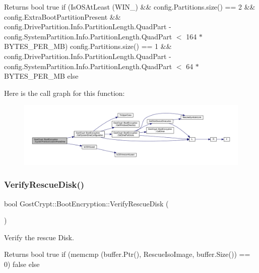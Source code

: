 \begin{DoxyReturn}{Returns}
bool true if (Is\+O\+S\+At\+Least (W\+I\+N\+\_) \&\& config.\+Partitions.\+size() == 2 \&\& config.\+Extra\+Boot\+Partition\+Present \&\& config.\+Drive\+Partition.\+Info.\+Partition\+Length.\+Quad\+Part -\/ config.\+System\+Partition.\+Info.\+Partition\+Length.\+Quad\+Part $<$ 164 $\ast$ B\+Y\+T\+E\+S\+\_\+\+P\+E\+R\+\_\+\+MB) config.\+Partitions.\+size() == 1 \&\& config.\+Drive\+Partition.\+Info.\+Partition\+Length.\+Quad\+Part -\/ config.\+System\+Partition.\+Info.\+Partition\+Length.\+Quad\+Part $<$ 64 $\ast$ B\+Y\+T\+E\+S\+\_\+\+P\+E\+R\+\_\+\+MB else 
\end{DoxyReturn}
Here is the call graph for this function\+:
\nopagebreak
\begin{figure}[H]
\begin{center}
\leavevmode
\includegraphics[width=350pt]{class_gost_crypt_1_1_boot_encryption_a770514730f74d63e147ea3b2510f5e0f_cgraph}
\end{center}
\end{figure}
\mbox{\label{class_gost_crypt_1_1_boot_encryption_a4792c6e0ed22b531c34152be522c8106}} 
\subsubsection{\texorpdfstring{Verify\+Rescue\+Disk()}{VerifyRescueDisk()}}
{\footnotesize\ttfamily bool Gost\+Crypt\+::\+Boot\+Encryption\+::\+Verify\+Rescue\+Disk (\begin{DoxyParamCaption}{ }\end{DoxyParamCaption})}



Verify the rescue Disk. 

\begin{DoxyReturn}{Returns}
bool true if (memcmp (buffer.\+Ptr(), Rescue\+Iso\+Image, buffer.\+Size()) == 0) false else 
\end{DoxyReturn}
\mbox{\label{class_gost_crypt_1_1_boot_encryption_ab87016e42d7f7826282297e50db00742}} 
